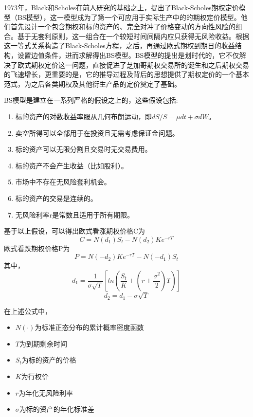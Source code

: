 1973年，Black和Scholes在前人研究的基础之上，提出了Black-Scholes期权定价模型（BS模型），这一模型成为了第一个可应用于实际生产中的的期权定价模型。他们首先设计一个包含期权和标的资产的、完全对冲了价格变动的方向性风险的组合。基于无套利原则，这一组合在一个较短时间间隔内应只获得无风险收益。根据这一等式关系构造了Black-Scholes方程，之后，再通过欧式期权到期日的收益结构，设置边值条件，进而求解得出BS模型。BS模型的提出是划时代的，它不仅解决了欧式期权定价这一问题，直接促进了芝加哥期权交易所的诞生和之后期权交易的飞速增长，更重要的是，它的推导过程及背后的思想提供了期权定价的一个基本范式，为之后各类期权及其他衍生产品的定价奠定了基础。

BS模型是建立在一系列严格的假设之上的，这些假设包括:

\begin{enumerate}
    \item 标的资产的对数收益率服从几何布朗运动，即$dS/S=\mu dt+\sigma dW$。
    \item 卖空所得可以全部用于在投资且无需考虑保证金问题。
    \item 标的资产可以无限分割且交易时无交易费用。
    \item 标的资产不会产生收益（比如股利）。
    \item 市场中不存在无风险套利机会。
    \item 标的资产的交易是连续的。
    \item 无风险利率r是常数且适用于所有期限。
\end{enumerate}

基于以上假设，可以得出欧式看涨期权价格C为
\begin{equation}
  C=N(d_1)S_t-N(d_2)Ke^{-rT}
\end{equation}
欧式看跌期权价格P为
\begin{equation}
  P=N(-d_2)Ke^{-rT}-N(-d_1)S_t
\end{equation}
其中，
\begin{equation}
  d_1=\frac{1}{\sigma \sqrt{T}}[ln(\frac{S_t}{K}+(r+\frac{\sigma ^2}{2})T)]
\end{equation}
\begin{equation}
  d_2=d_1-\sigma \sqrt{T}
\end{equation}

在上述公式中，

\begin{itemize}
  \item $N(\cdot)$为标准正态分布的累计概率密度函数
  \item $T$为到期剩余时间
  \item $S_t$为标的资产的价格
  \item $K$为行权价
  \item $r$为年化无风险利率
  \item $\sigma$为标的资产的年化标准差
\end{itemize}

